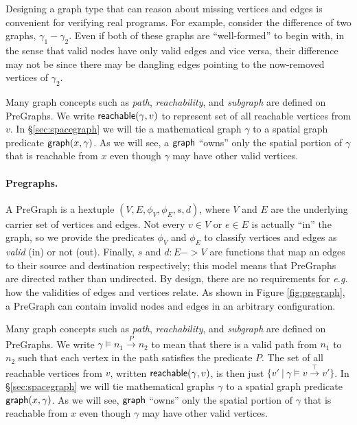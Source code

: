 Designing a graph type that can reason about missing vertices and edges is convenient for verifying real programs.  For example, consider the difference of two graphs, $\gamma_1 - \gamma_2$.  Even if both of these graphs are ``well-formed'' to begin with, in the sense that valid nodes have only valid edges and vice versa, their difference may not be since there may be dangling edges pointing to the now-removed vertices of $\gamma_2$.

Many graph concepts such as \emph{path}, \emph{reachability}, and \emph{subgraph} are defined on PreGraphs.  We write $\mathsf{reachable}(\gamma,v)$ to represent set of all reachable vertices from $v$.
In \S\ref{sec:spacegraph} we will tie a mathematical graph $\gamma$ to a spatial graph predicate
$\mathsf{graph}(x, \gamma)$.   As we will see, a $\mathsf{graph}$ ``owns'' only the
spatial portion of $\gamma$ that is reachable
from $x$ even though $\gamma$ may have other valid vertices.
\fi
\iffalse
\paragraph{Pregraphs.} A PreGraph is a hextuple $(V, E, \phi_V, \phi_E, s, d)$,
where $V$ and $E$ are the underlying carrier set of vertices and edges.  Not every $v \in V$ or $e \in E$ is actually ``in'' the graph, so we provide the predicates $\phi_V$ and $\phi_E$ to classify vertices and edges as \emph{valid} (in) or not (out).  Finally, $s$ and $d : E -> V$ are functions that map an edges to their source and destination respectively; this model means that PreGraphs are directed rather than undirected.  By design, there are no requirements for \emph{e.g.} how the validities of edges and vertices relate.  As shown in Figure \ref{fig:pregraph}, a PreGraph can contain invalid nodes and edges in an arbitrary configuration.

Many graph concepts such as \emph{path}, \emph{reachability}, and \emph{subgraph} are defined on PreGraphs.  We write $\gamma\models n_1 \xrightarrow{P} n_2$ to mean that there is a valid path from $n_1$ to $n_2$ such that each vertex in the path satisfies the predicate $P$.  The set of all reachable vertices from $v$, written $\mathsf{reachable}(\gamma,v)$, is then just $\{v' ~|~ \gamma\models v \xrightarrow{\top} v'\}$.
In \S\ref{sec:spacegraph} we will tie mathematical graphs $\gamma$ to a spatial graph predicate
$\mathsf{graph}(x, \gamma)$.   As we will see, $\mathsf{graph}$ ``owns'' only the
spatial portion of $\gamma$ that is reachable
from $x$ even though $\gamma$ may have other valid vertices.

